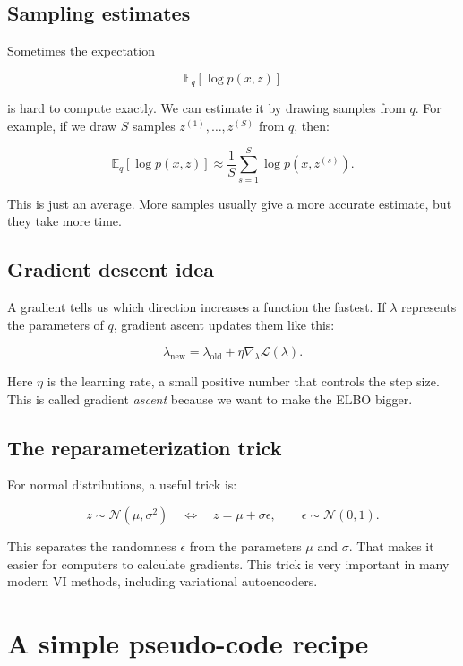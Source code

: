 \documentclass[11pt]{article}
\newcommand{\E}{\mathbb{E}}
\begin{document}
\subsection{Sampling estimates}

Sometimes the expectation

\[
\E_q[\log p(x,z)]
\]

is hard to compute exactly. We can estimate it by drawing samples from $q$.
For example, if we draw $S$ samples $z^{(1)},\ldots,z^{(S)}$ from $q$, then:

\[
\E_q[\log p(x,z)] \approx \frac{1}{S}\sum_{s=1}^S \log p(x,z^{(s)}).
\]

This is just an average. More samples usually give a more accurate estimate, but they take more time.

\subsection{Gradient descent idea}

A gradient tells us which direction increases a function the fastest.
If $\lambda$ represents the parameters of $q$, gradient ascent updates them like this:

\[
\lambda_{\text{new}}
= \lambda_{\text{old}} + \eta \nabla_{\lambda}\mathcal{L}(\lambda).
\]

Here $\eta$ is the learning rate, a small positive number that controls the step size.
This is called gradient \emph{ascent} because we want to make the ELBO bigger.

\subsection{The reparameterization trick}

For normal distributions, a useful trick is:

\[
z \sim \mathcal{N}(\mu,\sigma^2)
\quad \Longleftrightarrow \quad
z = \mu + \sigma\epsilon, \qquad \epsilon \sim \mathcal{N}(0,1).
\]

This separates the randomness $\epsilon$ from the parameters $\mu$ and $\sigma$.
That makes it easier for computers to calculate gradients.
This trick is very important in many modern VI methods, including variational autoencoders.

\section{A simple pseudo-code recipe}
\end{document}
